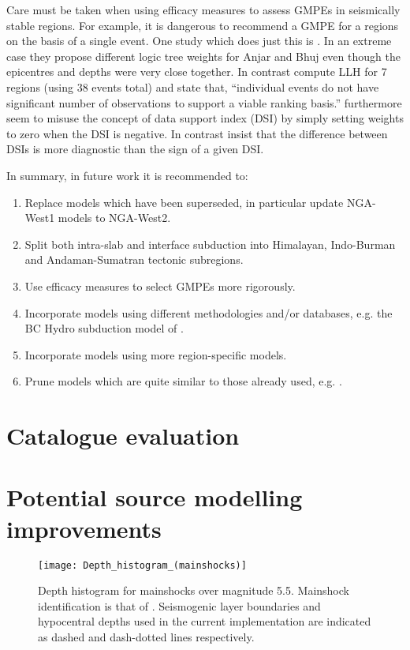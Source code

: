 \documentclass{article}
\begin{document}
\begin{appendices}
Care must be taken when using efficacy measures to assess GMPEs in seismically stable regions. 
For example, it is dangerous to recommend a GMPE for a regions on the basis of a single event.
One study which does just this is \citep{anbazhagan2015selection}.
In an extreme case they propose different logic tree weights for Anjar and Bhuj  even though the epicentres and depths were very close together.
In contrast \cite{nath2011peak} compute LLH for 7 regions (using 38 events total) and state that, ``individual events do not have significant number of observations to support a viable ranking basis.''
\cite{anbazhagan2015selection} furthermore seem to misuse the concept of data support index (DSI) by simply setting weights to zero when the DSI is negative.
In contrast \cite{delavaud2012testing} insist that the difference between DSIs is more diagnostic than the sign of a given DSI.

In summary, in future work it is recommended to:
\begin{enumerate}
\item Replace models which have been superseded, in particular update NGA-West1 models to NGA-West2.
\item Split both intra-slab and interface subduction into Himalayan, Indo-Burman and Andaman-Sumatran tectonic subregions.
\item Use efficacy measures to select GMPEs more rigorously.
\item Incorporate models using different methodologies and/or databases, e.g. the BC Hydro subduction model of \cite{abrahamson2016bc}.
\item Incorporate models using more region-specific models.
\item Prune models which are quite similar to those already used, e.g. \cite{toro2002modification}.
\end{enumerate}

\section{Catalogue evaluation}
\label{app:Catalogue}

\section{Potential source modelling improvements}
\label{app:SourceModelImprovements}

\begin{figure}[htb]
\begin{adjustbox}{center}
\texttt{[image: Depth\_histogram\_(mainshocks)]}
\end{adjustbox}
\caption[Depth histogram for mainshocks]{Depth histogram for mainshocks over magnitude 5.5.
Mainshock identification is that of \cite{nath2010earthquake}.
Seismogenic layer boundaries and hypocentral depths used in the current implementation are indicated as dashed and dash-dotted lines respectively.}
\label{fig:DepthHistogram}
\end{figure}


\end{appendices}
\end{document}
